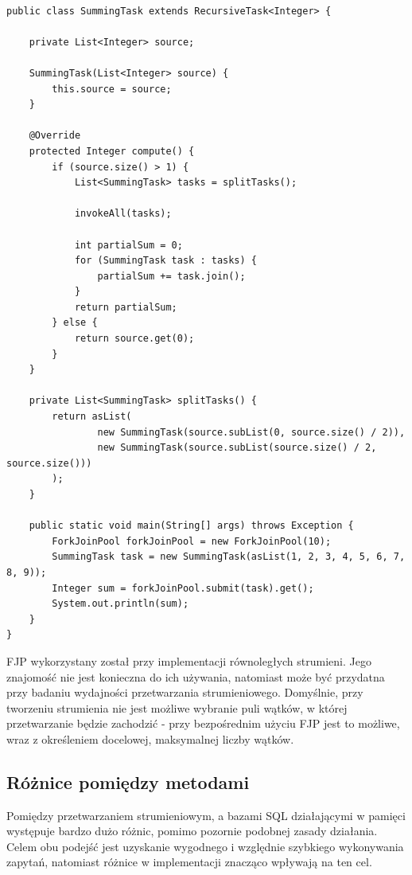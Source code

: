 \documentclass[12pt]{extarticle}
\begin{document}
\begin{lstlisting}[label=fjpexample, caption=Przykładowe wykorzystanie FJP]

public class SummingTask extends RecursiveTask<Integer> {
    
    private List<Integer> source;
    
    SummingTask(List<Integer> source) {
        this.source = source;
    }
    
    @Override
    protected Integer compute() {
        if (source.size() > 1) {
            List<SummingTask> tasks = splitTasks();
            
            invokeAll(tasks);
            
            int partialSum = 0;
            for (SummingTask task : tasks) {
                partialSum += task.join();
            }
            return partialSum;
        } else {
            return source.get(0);
        }
    }
    
    private List<SummingTask> splitTasks() {
        return asList(
                new SummingTask(source.subList(0, source.size() / 2)),
                new SummingTask(source.subList(source.size() / 2, source.size()))
        );
    }
    
    public static void main(String[] args) throws Exception {
        ForkJoinPool forkJoinPool = new ForkJoinPool(10);
        SummingTask task = new SummingTask(asList(1, 2, 3, 4, 5, 6, 7, 8, 9));
        Integer sum = forkJoinPool.submit(task).get();
        System.out.println(sum);
    }
}

\end{lstlisting}

    FJP wykorzystany został przy implementacji równoległych strumieni. Jego znajomość nie jest konieczna do ich używania, natomiast może być przydatna przy badaniu wydajności przetwarzania strumieniowego. Domyślnie, przy tworzeniu strumienia nie jest możliwe wybranie puli wątków, w której przetwarzanie będzie zachodzić - przy bezpośrednim użyciu FJP jest to możliwe, wraz z określeniem docelowej, maksymalnej liczby wątków.

\subsection{Różnice pomiędzy metodami}

    Pomiędzy przetwarzaniem strumieniowym, a bazami SQL działającymi w pamięci występuje bardzo dużo różnic, pomimo pozornie podobnej zasady działania. Celem obu podejść jest uzyskanie wygodnego i względnie szybkiego wykonywania zapytań, natomiast różnice w implementacji znacząco wpływają na ten cel.
\end{document}
